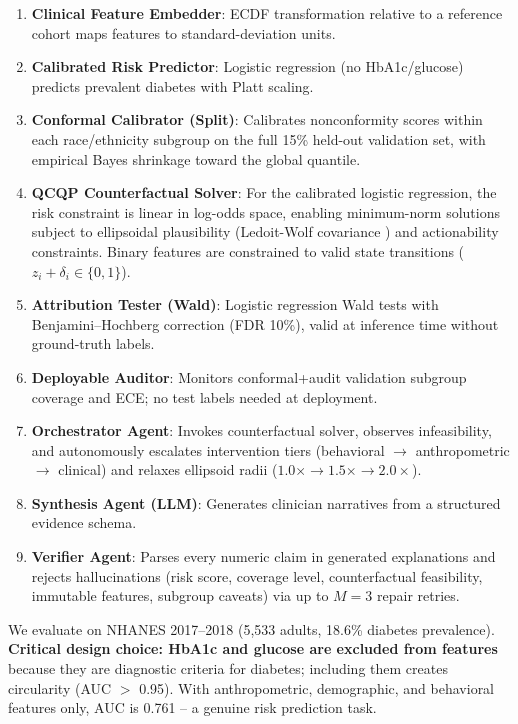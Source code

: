\documentclass[11pt,a4paper]{article}
\theoremstyle{plain}
\begin{document}
\begin{enumerate}
    \item \textbf{Clinical Feature Embedder}: ECDF transformation relative to a reference cohort maps features to standard-deviation units.
    \item \textbf{Calibrated Risk Predictor}: Logistic regression (no HbA1c/glucose) predicts prevalent diabetes with Platt scaling.
    \item \textbf{Conformal Calibrator (Split)}: Calibrates nonconformity scores within each race/ethnicity subgroup on the full 15\% held-out validation set, with empirical Bayes shrinkage toward the global quantile.
    \item \textbf{QCQP Counterfactual Solver}: For the calibrated logistic regression, the risk constraint is linear in log-odds space, enabling minimum-norm solutions subject to ellipsoidal plausibility (Ledoit-Wolf covariance \citep{ledoit2004well}) and actionability constraints. Binary features are constrained to valid state transitions ($z_i + \delta_i \in \{0,1\}$).
    \item \textbf{Attribution Tester (Wald)}: Logistic regression Wald tests with Benjamini--Hochberg correction (FDR 10\%), valid at inference time without ground-truth labels.
    \item \textbf{Deployable Auditor}: Monitors conformal+audit validation subgroup coverage and ECE; no test labels needed at deployment.
    \item \textbf{Orchestrator Agent}: Invokes counterfactual solver, observes infeasibility, and autonomously escalates intervention tiers (behavioral $\to$ anthropometric $\to$ clinical) and relaxes ellipsoid radii ($1.0\times \to 1.5\times \to 2.0\times$).
    \item \textbf{Synthesis Agent (LLM)}: Generates clinician narratives from a structured evidence schema.
    \item \textbf{Verifier Agent}: Parses every numeric claim in generated explanations and rejects hallucinations (risk score, coverage level, counterfactual feasibility, immutable features, subgroup caveats) via up to $M=3$ repair retries.
\end{enumerate}

We evaluate on NHANES 2017--2018 (5,533 adults, 18.6\% diabetes prevalence). \textbf{Critical design choice: HbA1c and glucose are excluded from features} because they are diagnostic criteria for diabetes; including them creates circularity (AUC $>$ 0.95). With anthropometric, demographic, and behavioral features only, AUC is 0.761 -- a genuine risk prediction task.
\end{document}
